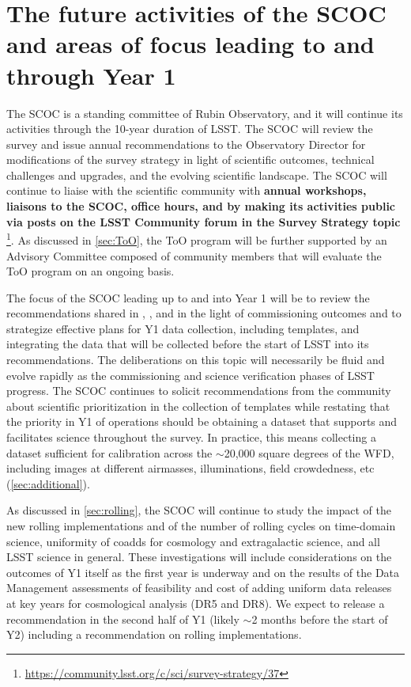 \section{The future activities of the SCOC and areas of focus leading to and through Year 1}\label{sec:next}

The SCOC is a standing committee of Rubin Observatory, and it will continue its activities through the 10-year duration of LSST. The SCOC will review the survey and issue annual recommendations to the Observatory Director for modifications of the survey strategy in light of scientific outcomes, technical challenges and upgrades, and the evolving scientific landscape. The SCOC will continue to liaise with the scientific community with {\bf annual workshops, liaisons to the SCOC, office hours, and by making its activities public via posts on the LSST Community forum in the Survey Strategy topic}
\footnote{\url{https://community.lsst.org/c/sci/survey-strategy/37}}. As discussed in \autoref{sec:ToO}, the ToO program will be further supported by an Advisory Committee composed of community members that will evaluate the ToO program on an ongoing basis. 

The focus of the SCOC leading up to and into Year 1 will be to review the recommendations shared in , , and  in the light of commissioning outcomes and to strategize effective plans for Y1 data collection, including templates, and integrating the data that will be collected before the start of LSST into its recommendations. The deliberations on this topic will necessarily be fluid and evolve rapidly as the commissioning and science verification phases of LSST progress. The SCOC continues to solicit recommendations from the community about scientific prioritization in the collection of templates while restating that the priority in Y1 of operations should be obtaining a dataset that supports and facilitates science throughout the survey. In practice, this means collecting a dataset sufficient for calibration across the \mbox{$\sim$20,000} square degrees of the WFD, including images at different airmasses, illuminations, field crowdedness, etc (\autoref{sec:additional}).

As discussed in \autoref{sec:rolling}, the SCOC will continue to study the impact of the new rolling implementations and of the number of rolling cycles on time-domain science, uniformity of coadds for cosmology and extragalactic science, and all LSST science in general. These investigations will include considerations on the outcomes of Y1 itself as the first year is underway and on the results of the Data Management assessments of feasibility and cost of adding uniform data releases at key years for cosmological analysis (DR5 and DR8). We expect to release a recommendation in the second half of Y1 (likely \mbox{$\sim$2} months before the start of Y2) including a recommendation on rolling implementations.

